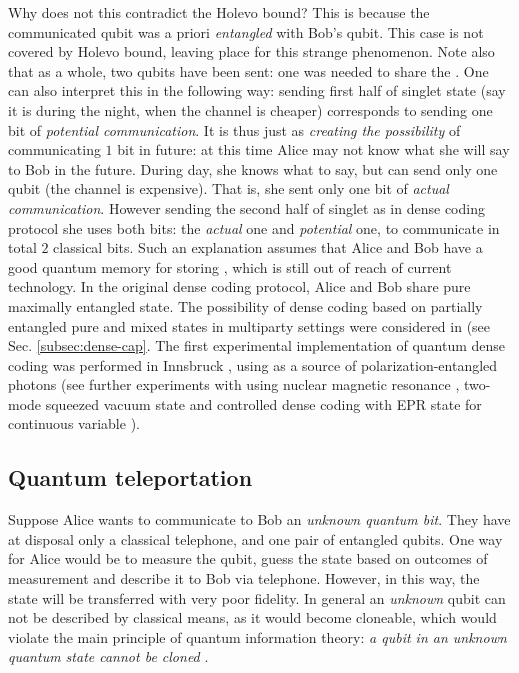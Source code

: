 \documentclass[rmp,12pt,preprint]{revtex4-2}
\begin{document}
Why does not this contradict the Holevo bound? This is because the
communicated qubit was a priori {\it entangled} with Bob's qubit. This
case is not covered by Holevo bound, leaving place for this strange
phenomenon. Note also that as a whole, two qubits have been sent: one
was needed to share the \eprstate. One can also interpret this in the
following way: sending first half of singlet state (say it is during
the night, when the channel is cheaper) corresponds to sending one bit
of {\it potential communication}. It is thus just as {\it creating the
  possibility} of communicating $1$ bit in future: at this time Alice
may not know what she will say to Bob in the future. During day, she
knows what to say, but can send only one qubit (the channel is
expensive). That is, she sent only one bit of {\it actual
  communication}. However sending the second half of singlet as in
dense coding protocol she uses both bits: the {\it actual} one and
{\it potential} one, to communicate in total $2$ classical bits. Such
an explanation assumes that Alice and Bob have a good quantum memory
for storing \eprstates, which is still out of reach of current
technology. In the original dense coding protocol, Alice and Bob share
pure maximally entangled state.  The possibility of dense coding based
on partially entangled pure and mixed states in multiparty settings
were considered in
\cite{BarencoE1995-dense,HausladenJSWW1996-cl-cap,mixed_dense_coding,not_so_super_dc,BosePV_1998dense,ZimanB2003_dense}
(see Sec. \ref{subsec:dense-cap}. The first experimental implementation of quantum dense coding was performed in Innsbruck \cite {Dense_practical}, using as a source of polarization-entangled photons (see further experiments with using nuclear magnetic resonance \cite{FangZFDM1999}, two-mode squeezed vacuum state \cite {MizunoWFS2005} and  controlled dense coding with EPR state for continuous variable \cite {JietaiJYFXCK2003}).

\subsection{Quantum teleportation}
\label{subsec:Telep}

Suppose Alice wants to communicate to Bob an {\it unknown quantum
  bit}. They have at disposal only a classical telephone, and one pair
of entangled qubits. One way for Alice would be to measure the qubit,
guess the state based on outcomes of measurement and describe it to
Bob via telephone. However, in this way, the state will be transferred
with very poor fidelity. In general an {\it unknown} qubit can not be
described by classical means, as it would become cloneable, which
would violate the main principle of quantum information theory: {\it a
  qubit in an unknown quantum state cannot be cloned}
\cite{WoottersZ-cloning,Dieks-cloning}.
\end{document}
